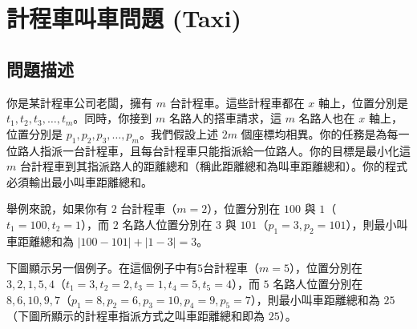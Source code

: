 \section{計程車叫車問題 (Taxi)}

\subsection{問題描述}

你是某計程車公司老闆，擁有 \(m\) 台計程車。這些計程車都在 \(x\)
軸上，位置分別是 \(t_1, t_2, t_3, \ldots,t_m\)。同時，你接到 \(m\)
名路人的搭車請求，這 \(m\) 名路人也在 \(x\) 軸上，位置分別是
\(p_1, p_2, p_3, \ldots, p_m\)。我們假設上述 \(2m\)
個座標均相異。你的任務是為每一位路人指派一台計程車，且每台計程車只能指派給一位路人。你的目標是最小化這
\(m\)
台計程車到其指派路人的距離總和（稱此距離總和為叫車距離總和）。你的程式必須輸出最小叫車距離總和。

舉例來說，如果你有 \(2\) 台計程車（\(m=2\)），位置分別在 \(100\) 與
\(1\)（\(t_1=100, t_2=1\)），而 \(2\) 名路人位置分別在 \(3\) 與
\(101\)（\(p_1=3, p_2=101\)），則最小叫車距離總和為
\(|100-101|+|1-3|=3\)。

下圖顯示另一個例子。在這個例子中有\(5\)台計程車（\(m=5\)），位置分別在
\(3, 2, 1, 5, 4\)（\(t_1=3, t_2=2, t_3=1, t_4=5, t_5=4\)），而 \(5\)
名路人位置分別在
\(8, 6, 10, 9, 7\)（\(p_1=8, p_2=6, p_3=10, p_4=9, p_5=7\)），則最小叫車距離總和為
\(25\)（下圖所顯示的計程車指派方式之叫車距離總和即為 \(25\)）。

\begin{center}
\end{center}

